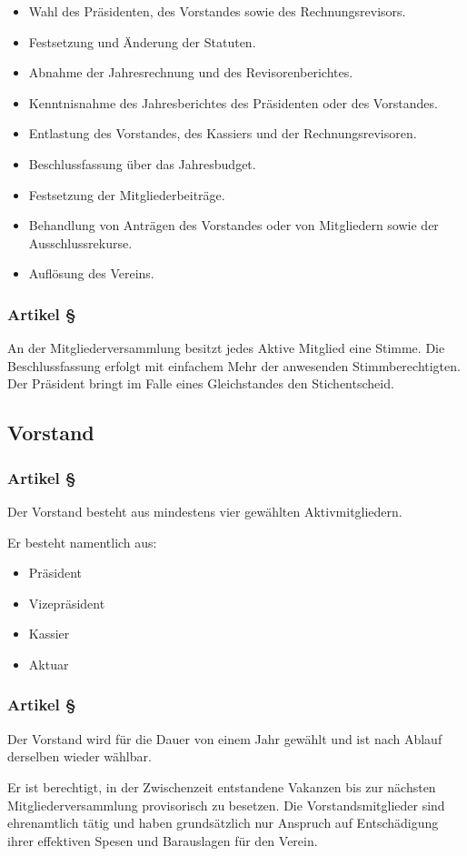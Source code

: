 \begin{itemize}
	\item Wahl des Präsidenten, des Vorstandes sowie des
		Rechnungsrevisors.
	\item Festsetzung und Änderung der Statuten.
	\item Abnahme der Jahresrechnung und des Revisorenberichtes.
	\item Kenntnisnahme des Jahresberichtes des Präsidenten oder des
		Vorstandes.
	\item Entlastung des Vorstandes, des Kassiers und der
		Rechnungsrevisoren.
	\item Beschlussfassung über das Jahresbudget.
	\item Festsetzung der Mitgliederbeiträge.
	\item Behandlung von Anträgen des Vorstandes oder von Mitgliedern
		sowie der Ausschlussrekurse.
	\item Auflösung des Vereins.
\end{itemize}

\subsubsection*{Artikel §\articlenumber}
An der Mitgliederversammlung besitzt jedes Aktive Mitglied eine Stimme. Die
Beschlussfassung erfolgt mit einfachem Mehr der anwesenden Stimmberechtigten. 
Der Präsident bringt im Falle eines Gleichstandes den Stichentscheid.

\subsection{Vorstand}

\subsubsection*{Artikel §\articlenumber}
Der Vorstand besteht aus mindestens vier gewählten Aktivmitgliedern.

Er besteht namentlich aus:

\begin{itemize}
	\item Präsident
	\item Vizepräsident
	\item Kassier
	\item Aktuar
\end{itemize}
 
\subsubsection*{Artikel §\articlenumber}
Der Vorstand wird für die Dauer von einem Jahr gewählt und ist nach Ablauf
derselben wieder wählbar.

Er ist berechtigt, in der Zwischenzeit entstandene Vakanzen bis zur nächsten
Mitgliederversammlung provisorisch zu besetzen. Die Vorstandsmitglieder sind
ehrenamtlich tätig und haben grundsätzlich nur Anspruch auf Entschädigung
ihrer effektiven Spesen und Barauslagen für den Verein.
